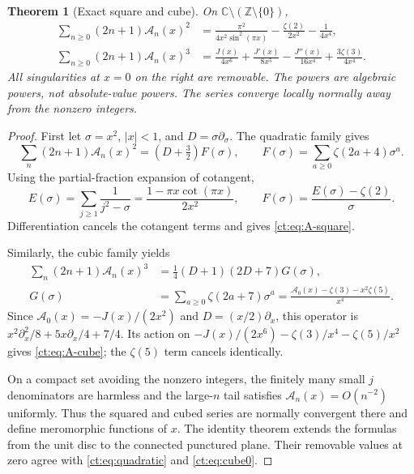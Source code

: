 \documentclass[11pt]{article}
\numberwithin{equation}{section}
\newtheorem{theorem}{Theorem}[section]
\theoremstyle{definition}\newtheorem{definition}[theorem]{Definition}
\theoremstyle{remark}\newtheorem{remark}[theorem]{Remark}
\newcommand{\CC}{\mathbb C}
\begin{document}
\begin{theorem}[Exact square and cube]\label{ct:thm:digamma}
On $\CC\setminus(\mathbb Z\setminus\{0\})$,
\begin{align}
 \sum_{n\ge0}(2n+1)\mathcal A_n(x)^2
    &=\frac{\pi^2}{4x^2\sin^2(\pi x)}
        -\frac{\zeta(2)}{2x^2}-\frac1{4x^4},
       \label{ct:eq:A-square}\\
 \sum_{n\ge0}(2n+1)\mathcal A_n(x)^3
    &=\frac{J(x)}{4x^6}+\frac{J'(x)}{8x^5}
        -\frac{J''(x)}{16x^4}+\frac{3\zeta(3)}{4x^4}.
       \label{ct:eq:A-cube}
\end{align}
All singularities at $x=0$ on the right are removable. The powers are
algebraic powers, not absolute-value powers. The series converge locally
normally away from the nonzero integers.
\end{theorem}
\begin{proof}
First let $\sigma=x^2$, $|x|<1$, and $D=\sigma\partial_\sigma$.
The quadratic family gives
\[
 \sum_n(2n+1)\mathcal A_n(x)^2=(D+\tfrac32)F(\sigma),\qquad
 F(\sigma)=\sum_{a\ge0}\zeta(2a+4)\sigma^a.
\]
Using the partial-fraction expansion of cotangent,
\[
 E(\sigma)=\sum_{j\ge1}\frac1{j^2-\sigma}
       =\frac{1-\pi x\cot(\pi x)}{2x^2},\qquad
 F(\sigma)=\frac{E(\sigma)-\zeta(2)}{\sigma}.
\]
Differentiation cancels the cotangent terms and gives \eqref{ct:eq:A-square}.

Similarly, the cubic family yields
\begin{align*}
 \sum_n(2n+1)\mathcal A_n(x)^3
       &=\tfrac14(D+1)(2D+7)G(\sigma),\\
 G(\sigma)&=\sum_{a\ge0}\zeta(2a+7)\sigma^a
       =\frac{\mathcal A_0(x)-\zeta(3)-x^2\zeta(5)}{x^4}.
\end{align*}
Since $\mathcal A_0(x)=-J(x)/(2x^2)$ and $D=(x/2)\partial_x$, this operator
is $x^2\partial_x^2/8+5x\partial_x/4+7/4$.
Its action on $-J(x)/(2x^6)-\zeta(3)/x^4-\zeta(5)/x^2$ gives
\eqref{ct:eq:A-cube}; the $\zeta(5)$ term cancels identically.

On a compact set avoiding the nonzero integers, the finitely many small
$j$ denominators are harmless and the large-$n$ tail satisfies
$\mathcal A_n(x)=O(n^{-2})$ uniformly. Thus the squared and cubed series
are normally convergent there and define meromorphic functions of $x$.
The identity theorem extends the formulas from the unit disc to the
connected punctured plane. Their removable values at zero agree with
\eqref{ct:eq:quadratic} and \eqref{ct:eq:cube0}.
\end{proof}
\end{document}
